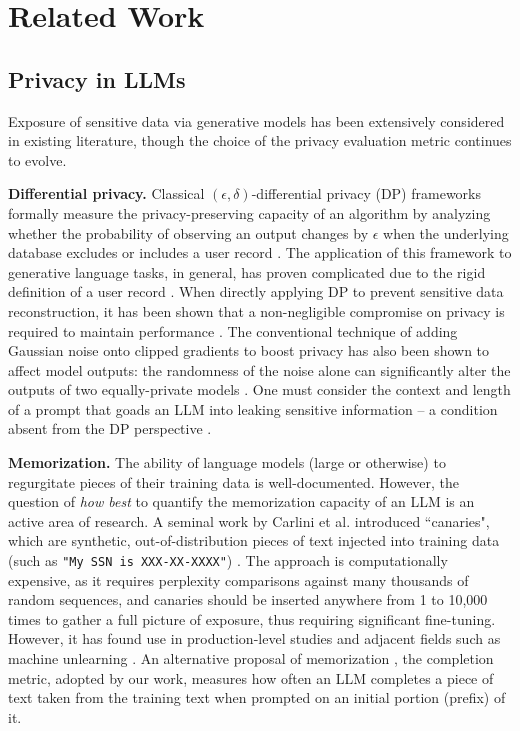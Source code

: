 \section{Related Work}
\label{sec:related_work}
\subsection{Privacy in LLMs}
Exposure of sensitive data via generative models has been extensively considered in existing literature, though the choice of the privacy evaluation metric continues to evolve.

\textbf{Differential privacy.} Classical $(\epsilon, \delta)$-differential privacy (DP) frameworks formally measure the privacy-preserving capacity of an algorithm by analyzing whether the probability of observing an output changes by $\epsilon$ when the underlying database excludes or includes a user record \citep{dwork2006calibrating}.
The application of this framework to generative language tasks, in general, has proven complicated due to the rigid definition of a user record \citep{jayaraman2019evaluating}. When directly applying DP to prevent sensitive data reconstruction, it has been shown that a non-negligible compromise on privacy is required to maintain performance \citep{lukas2023analyzing}. The conventional technique of adding Gaussian noise onto clipped gradients \citep{abadi2016deep} to boost privacy has also been shown to affect model outputs: the randomness of the noise alone can significantly alter the outputs of two equally-private models \citep{kulynych2023arbitrary}. One must consider the context and length of a prompt that goads an LLM into leaking sensitive information \citep{nissenbaum2004privacy, dourish2004we} -- a condition absent from the DP perspective \citep{brown2022does}. 

\textbf{Memorization.} The ability of language models (large or otherwise) to regurgitate pieces of their training data is well-documented. However, the question of \textit{how best} to quantify the memorization capacity of an LLM is an active area of research. A seminal work by Carlini et al. introduced ``canaries", which are synthetic, out-of-distribution pieces of text injected into training data (such as \texttt{"My SSN is XXX-XX-XXXX"}) \citep{carlini2019secret}. The approach is computationally expensive, as it requires perplexity comparisons against many thousands of random sequences, and canaries should be inserted anywhere from 1 to 10,000 times to gather a full picture of exposure, thus requiring significant fine-tuning. However, it has found use in production-level studies \citep{ramaswamy2020training} and adjacent fields such as machine unlearning \citep{jagielski2022measuring}. An alternative proposal of memorization \citep{carlini2022quantifying}, the completion metric, adopted by our work, measures how often an LLM completes a piece of text taken from the training text when prompted on an initial portion (prefix) of it.

